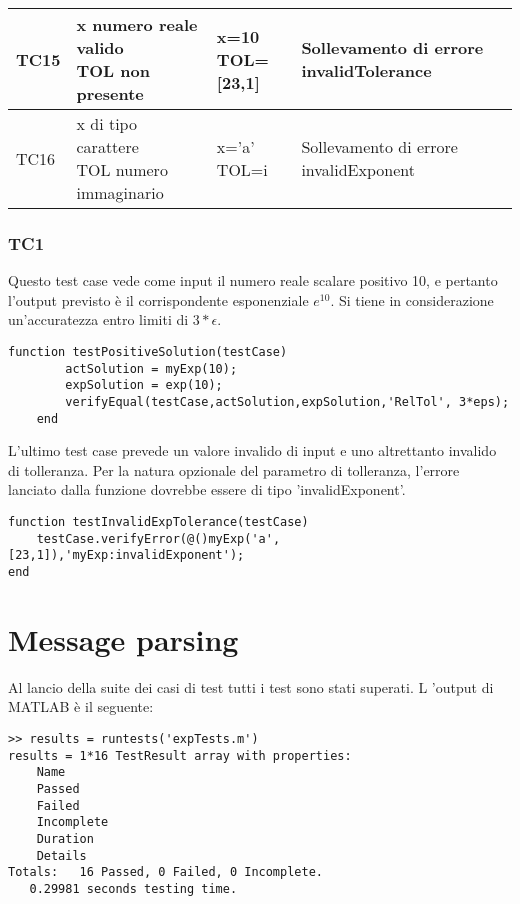 \documentclass[a4paper,titlepage]{article}
\begin{document}
{{\begin{tabularx}{1.325\textwidth}{| l | l | l | l | }
				TC15 & \pbox{20cm}{\vspace{.5\baselineskip}x numero reale valido\\ TOL non presente \vspace{.5\baselineskip}}										& \pbox{20cm}{x=10\\ TOL=[23,1]} 	& Sollevamento di errore invalidTolerance\\ \hline
				TC16 & \pbox{20cm}{\vspace{.5\baselineskip}x di tipo carattere\\ TOL numero immaginario \vspace{.5\baselineskip}}									& \pbox{20cm}{x='a'\\ TOL=i} 	& Sollevamento di errore invalidExponent \\ \hline
				\end{tabularx}}
		}	


\subsubsection{TC1}
Questo test case vede come input il numero reale scalare positivo 10, e pertanto l'output previsto è il corrispondente esponenziale $e^{10}$.
Si tiene in considerazione un'accuratezza entro limiti di $3*\epsilon$.
\begin{lstlisting}[caption=Test Case 1]
	function testPositiveSolution(testCase)
		actSolution = myExp(10);
		expSolution = exp(10);
		verifyEqual(testCase,actSolution,expSolution,'RelTol', 3*eps);
	end
\end{lstlisting}

L'ultimo test case prevede un valore invalido di input e uno altrettanto invalido di tolleranza.
Per la natura opzionale del parametro di tolleranza, l'errore lanciato dalla funzione dovrebbe essere di tipo 'invalidExponent'.
\begin{lstlisting}[caption=Test Case 16]
function testInvalidExpTolerance(testCase)
	testCase.verifyError(@()myExp('a',[23,1]),'myExp:invalidExponent');
end
\end{lstlisting}

\section{Message parsing}

Al lancio della suite dei casi di test tutti i test sono stati superati. L 'output di MATLAB è il seguente:
\begin{lstlisting}[caption=Risultati]
>> results = runtests('expTests.m')
results = 1*16 TestResult array with properties:
    Name
    Passed
    Failed
    Incomplete
    Duration
    Details
Totals:   16 Passed, 0 Failed, 0 Incomplete.
   0.29981 seconds testing time.
\end{lstlisting}
\end{document}
